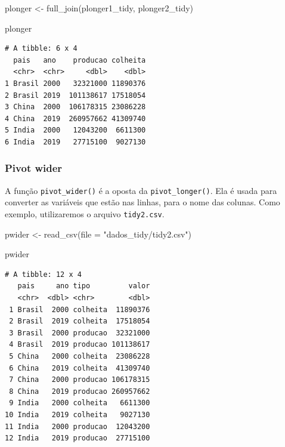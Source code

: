 \documentclass[
  brazilian,
]{book}
\newenvironment{Shaded}{\begin{snugshade}}{\end{snugshade}}
\newcommand{\AttributeTok}[1]{\textcolor[rgb]{0.77,0.63,0.00}{#1}}
\newcommand{\FunctionTok}[1]{\textcolor[rgb]{0.00,0.00,0.00}{#1}}
\newcommand{\NormalTok}[1]{#1}
\newcommand{\OtherTok}[1]{\textcolor[rgb]{0.56,0.35,0.01}{#1}}
\newcommand{\StringTok}[1]{\textcolor[rgb]{0.31,0.60,0.02}{#1}}
\begin{document}
\begin{Shaded}
\begin{Highlighting}[]
\NormalTok{plonger }\OtherTok{\textless{}{-}} \FunctionTok{full\_join}\NormalTok{(plonger1\_tidy, plonger2\_tidy)}

\NormalTok{plonger}
\end{Highlighting}
\end{Shaded}

\begin{verbatim}
# A tibble: 6 x 4
  pais   ano    producao colheita
  <chr>  <chr>     <dbl>    <dbl>
1 Brasil 2000   32321000 11890376
2 Brasil 2019  101138617 17518054
3 China  2000  106178315 23086228
4 China  2019  260957662 41309740
5 India  2000   12043200  6611300
6 India  2019   27715100  9027130
\end{verbatim}

\hypertarget{pivot-wider}{%
\subsubsection*{Pivot wider}\label{pivot-wider}}

A função \texttt{pivot\_wider()} é a oposta da \texttt{pivot\_longer()}. Ela é usada para converter as variáveis que estão nas linhas, para o nome das colunas. Como exemplo, utilizaremos o arquivo \texttt{tidy2.csv}.

\begin{Shaded}
\begin{Highlighting}[]
\NormalTok{pwider }\OtherTok{\textless{}{-}} \FunctionTok{read\_csv}\NormalTok{(}\AttributeTok{file =} \StringTok{"dados\_tidy/tidy2.csv"}\NormalTok{)}

\NormalTok{pwider}
\end{Highlighting}
\end{Shaded}

\begin{verbatim}
# A tibble: 12 x 4
   pais     ano tipo         valor
   <chr>  <dbl> <chr>        <dbl>
 1 Brasil  2000 colheita  11890376
 2 Brasil  2019 colheita  17518054
 3 Brasil  2000 producao  32321000
 4 Brasil  2019 producao 101138617
 5 China   2000 colheita  23086228
 6 China   2019 colheita  41309740
 7 China   2000 producao 106178315
 8 China   2019 producao 260957662
 9 India   2000 colheita   6611300
10 India   2019 colheita   9027130
11 India   2000 producao  12043200
12 India   2019 producao  27715100
\end{verbatim}
\end{document}
